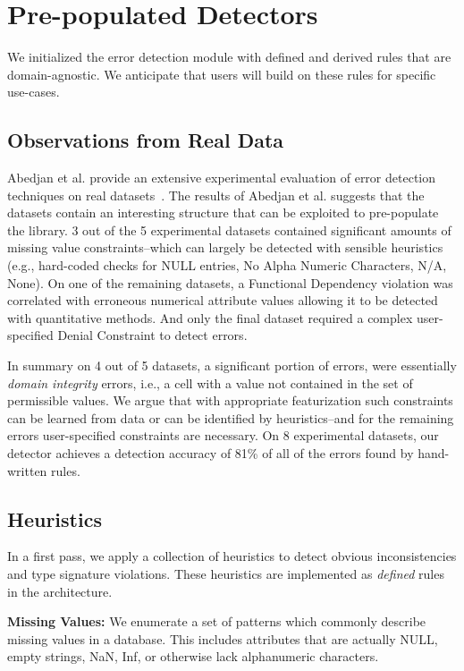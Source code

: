 \section{Pre-populated Detectors}
We initialized the error detection module with defined and derived rules that are domain-agnostic.
We anticipate that users will build on these rules for specific use-cases.

\subsection{Observations from Real Data}
Abedjan et al. provide an extensive experimental evaluation of error detection techniques on real datasets~\cite{DBLP:journals/pvldb/AbedjanCDFIOPST16}.
The results of Abedjan et al. suggests that the datasets contain an interesting structure that can be exploited to pre-populate the library.
3 out of the 5 experimental datasets contained significant amounts of missing value constraints--which can largely be detected with sensible heuristics (e.g., hard-coded checks for NULL entries, No Alpha Numeric Characters, N/A, None).
On one of the remaining datasets, a Functional Dependency violation was correlated with erroneous numerical attribute values allowing it to be detected with quantitative methods.
And only the final dataset required a complex user-specified Denial Constraint to detect errors. 

In summary on 4 out of 5 datasets, a significant portion of errors, were essentially \emph{domain integrity} errors, i.e., a cell with a value not contained in the set of permissible values.
We argue that with appropriate featurization such constraints can be learned from data or can be identified by heuristics--and for the remaining errors user-specified constraints are necessary.
On 8 experimental datasets, our detector achieves a detection accuracy of 81\% of all of the errors found by hand-written rules.

\subsection{Heuristics}
In a first pass, we apply a collection of heuristics to detect obvious inconsistencies and type signature violations. These heuristics are implemented as \emph{defined} rules in the architecture.

\vspace{0.5em}
\noindent\textbf{Missing Values: }  We enumerate a set of patterns which commonly describe missing values in a database. This includes attributes that are actually \textsf{NULL}, empty strings, NaN, Inf, or otherwise lack alphanumeric characters.

